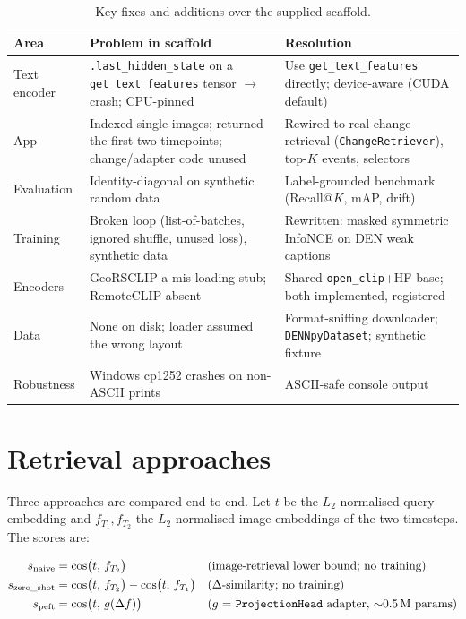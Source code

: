 \documentclass{article}
\begin{document}
\begin{table}[H]
    \centering
    \caption{Key fixes and additions over the supplied scaffold.}
    \label{tab:fixes}
    \begin{tabular}{p{2.6cm}p{5.2cm}p{5.2cm}}
        \toprule
        \textbf{Area} & \textbf{Problem in scaffold} & \textbf{Resolution} \\
        \midrule
        Text encoder & \texttt{.last\_hidden\_state} on a \texttt{get\_text\_features} tensor $\rightarrow$ crash; CPU-pinned & Use \texttt{get\_text\_features} directly; device-aware (CUDA default) \\
        App & Indexed single images; returned the first two timepoints; change/adapter code unused & Rewired to real change retrieval (\texttt{ChangeRetriever}), top-$K$ events, selectors \\
        Evaluation & Identity-diagonal on synthetic random data & Label-grounded benchmark (Recall@$K$, mAP, drift) \\
        Training & Broken loop (list-of-batches, ignored shuffle, unused loss), synthetic data & Rewritten: masked symmetric InfoNCE on DEN weak captions \\
        Encoders & GeoRSCLIP a mis-loading stub; RemoteCLIP absent & Shared \texttt{open\_clip}+HF base; both implemented, registered \\
        Data & None on disk; loader assumed the wrong layout & Format-sniffing downloader; \texttt{DENNpyDataset}; synthetic fixture \\
        Robustness & Windows cp1252 crashes on non-ASCII prints & ASCII-safe console output \\
        \bottomrule
    \end{tabular}
\end{table}


\section{Retrieval approaches}
\label{sec:approaches}

Three approaches are compared end-to-end. Let $t$ be the $L_2$-normalised query
embedding and $f_{T_1}, f_{T_2}$ the $L_2$-normalised image embeddings of the
two timesteps. The scores are:

\begin{align}
    s_{\text{naive}}     &= \cos\!\big(t,\, f_{T_2}\big) && \text{(image-retrieval lower bound; no training)} \\
    s_{\text{zero\_shot}} &= \cos\!\big(t,\, f_{T_2}\big) - \cos\!\big(t,\, f_{T_1}\big) && \text{($\Delta$-similarity; no training)} \\
    s_{\text{peft}}      &= \cos\!\big(t,\, g(\Delta f)\big) && \text{($g$ = \texttt{ProjectionHead} adapter, $\sim$0.5\,M params)}
\end{align}
\end{document}
